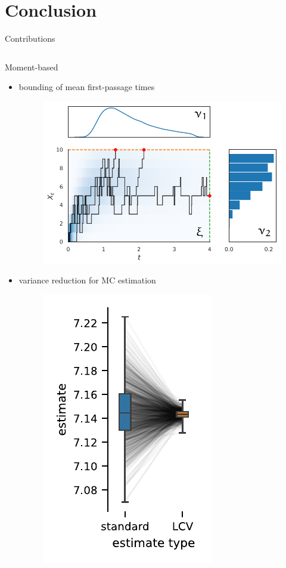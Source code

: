 \documentclass[9pt]{beamer}
\begin{document}
\section{Conclusion}
\begin{frame}{Contributions}
    \begin{columns}
        \begin{column}{.45\paperwidth}
            \begin{block}{Moment-based}
                \begin{itemize}
                    \item bounding of mean first-passage times \parencite{backenkohler2019bounding}
                        \begin{figure}
                            \includegraphics[width=.67\textwidth]{../gfx/decomp1.pdf}
                        \end{figure}
                    \item variance reduction for MC estimation \parencite{backenkohler2019control,backenkohler2021variance}
                        \begin{figure}
                            \includegraphics[width=.3\textwidth]{../gfx/adjustment_trans.pdf}
                        \end{figure}
                \end{itemize}

\end{block}
\end{column}
\end{columns}
\end{frame}
\end{document}
